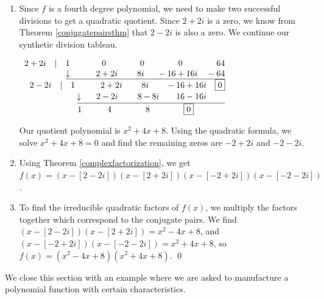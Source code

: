 \documentclass{ximera}
\begin{document}
\begin{example}
\begin{enumerate}
\item  Since $f$ is a fourth degree polynomial, we need to make two successful divisions to get a quadratic quotient.  Since $2+2i$ is a zero, we know from Theorem \ref{conjugatepairsthm} that $2-2i$ is also a zero.  We continue our synthetic division tableau.

\begin{center}
$
\begin{array}{r}
 2+2i \quad |\quad 1 \phantom{1.}\quad\quad\quad 0 \quad\quad\quad\quad 0 \quad\quad\quad\quad 0 \quad\quad\quad\quad 64\\
 \underline{\downarrow \phantom{1.}\quad\quad  2+2i \quad\phantom{11.} 8i\quad\phantom{1} -16+16i \quad -64}\\
 2-2i \quad |\quad 1 \phantom{11}\quad\quad 2+2i \quad\phantom{11.} 8i \quad\quad -16+16i \quad   \fbox{0}\\
 \underline{\downarrow \phantom{1}\quad  2-2i \quad\phantom{11.} 8-8i \quad\quad 16-16i \phantom{\quad \fbox{0}}}\\
1 \phantom{11}\quad\quad 4 \phantom{11}\quad\quad\quad 8 \phantom{11}\quad\quad \quad \fbox{0}  \phantom{\phantom{1}\quad\quad \fbox{0}}
\end{array}
$    
\end{center}

Our quotient polynomial is $x^2+4x+8$.  Using the quadratic formula, we solve $x^2+4x+8 = 0$ and find the remaining zeros are $-2+2i$ and $-2-2i$.  

\item  Using Theorem \ref{complexfactorization}, we get $f(x) = (x-[2-2i])(x-[2+2i])(x-[-2+2i])(x-[-2-2i])$.

\item  To find the irreducible quadratic factors of $f(x)$, we multiply the factors together which correspond to the conjugate pairs.  We find $(x-[2-2i])(x-[2+2i]) = x^2-4x+8$, and $(x-[-2+2i])(x-[-2-2i]) = x^2+4x+8$, so  $f(x) =  \left(x^2-4x+8\right) \left(x^2+4x+8\right)$. \qed

\end{enumerate}

\end{example}


We close this section with an example where we are asked to manufacture a polynomial function with certain characteristics.
\end{document}
